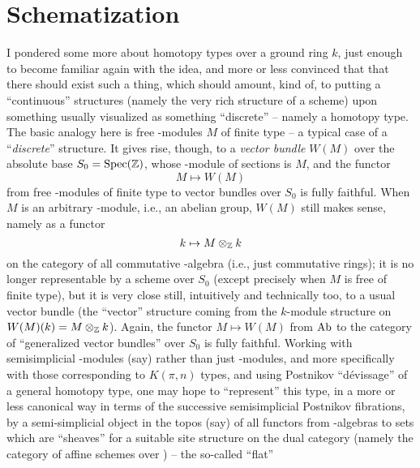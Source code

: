 
\chapter{Schematization}
\label{ch:VI}

\presectionfill{}\par

\label{sec:110}%
I pondered some more about homotopy types over a ground ring $k$, just
enough to become familiar again with the idea, and more or less
convinced that that there should exist such a thing, which should
amount, kind of, to putting a ``continuous'' structures (namely the
very rich structure of a scheme) upon something usually visualized as
something ``discrete'' -- namely a homotopy type. The basic analogy
here is free \bZ-modules $M$ of finite type -- a typical case of a
``\emph{discrete}'' structure. It gives rise, though, to a
\emph{vector bundle} $W(M)$ over the absolute base $S_0=\operatorname{Spec}({\mathbb{Z}})$,
whose \bZ-module of sections is $M$, and the functor
\[M\mapsto W(M)\]
from free \bZ-modules of finite type to vector bundles over $S_0$ is
fully faithful. When $M$ is an arbitrary \bZ-module, i.e., an abelian
group, $W(M)$ still makes sense, namely as a functor
\[k\mapsto M\otimes_{\mathbb{Z}} k\]
on the category of all commutative \bZ-algebra (i.e., just commutative
rings); it is no longer representable by a scheme over $S_0$ (except
precisely when $M$ is free of finite type), but it is very close
still, intuitively and technically too, to a usual vector bundle (the
``vector'' structure coming from the $k$-module structure on
$W(M)(k)=M\otimes_{\mathbb{Z}} k$). Again, the functor $M\mapsto W(M)$ from
$\operatorname{Ab}$ to the category of ``generalized vector bundles'' over $S_0$
is fully faithful. Working with semisimplicial \bZ-modules (say)
rather than just \bZ-modules, and more specifically with those
corresponding to $K(\pi,n)$ types, and using Postnikov
``dévissage''
of a general homotopy type, one may hope to ``represent'' this type,
in a more or less canonical way in terms of the successive
semisimplicial Postnikov fibrations, by a semi-simplicial object in
the topos (say) of all functors from \bZ-algebras to sets which are
``sheaves'' for a suitable site structure on the dual category (namely
the category of affine schemes over \bZ) -- the so-called ``flat''
